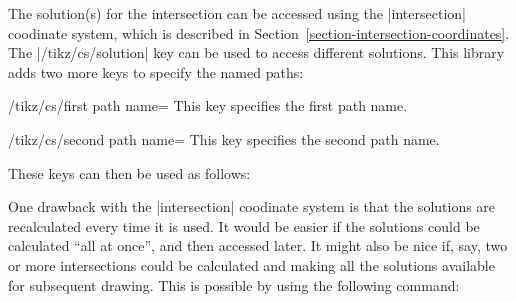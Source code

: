   The solution(s) for the intersection can be accessed using the
  |intersection| coodinate system, which is described in 
  Section~\ref{section-intersection-coordinates}. The 
  |/tikz/cs/solution| key can be used to access different
  solutions. This library adds two more keys
  to specify the named paths:

\begin{key}{/tikz/cs/first path name=}
  This key specifies the first path name.
\end{key}

\begin{key}{/tikz/cs/second path name=}
  This key specifies the second path name.
\end{key}
  
  These keys can then be used as follows:
  
\begin{codeexample}[]
\end{codeexample}

  One drawback with the |intersection| coodinate system is that
  the solutions are recalculated every time it is used. It would be
  easier if the solutions could be calculated ``all at once'', and
  then accessed later. It might also be nice if, say, two or
  more intersections could be calculated and making all the solutions
  available for subsequent drawing.
  This is possible by using the following command:
 
